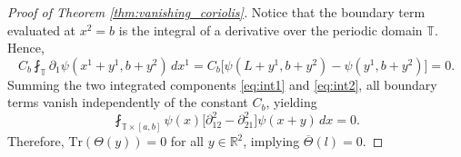 \documentclass[10pt,a4paper]{amsart}
\begin{document}
\begin{proof}[Proof of Theorem \ref{thm:vanishing_coriolis}]
Notice that the boundary term evaluated at $x^2=b$ is the integral of a derivative over the periodic domain $\mathbb{T}$. Hence,
\begin{equation*}
    C_b \fint_{\mathbb{T}} \partial_1 \psi(x^1+y^1, b+y^2) \, dx^1 = C_b \big[ \psi(L+y^1, b+y^2) - \psi(y^1, b+y^2) \big] = 0.
\end{equation*}
Summing the two integrated components \eqref{eq:int1} and \eqref{eq:int2}, all boundary terms vanish independently of the constant $C_b$, yielding 
\begin{equation}\label{eq:coclusionvanish}
    \fint_{\mathbb{T} \times [a, b]} \psi(x) \big[ \partial_{12}^2 - \partial_{21}^2 \big] \psi(x+y) \, dx = 0.
\end{equation}
Therefore, $\text{Tr}(\varTheta(y)) = 0$ for all $y \in \mathbb{R}^2$, implying $\overline{\varTheta}(l) = 0$.
\end{proof}
\end{document}
